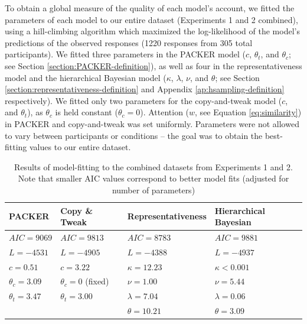 \documentclass[12pt]{article}
\begin{document}
\begin{flushleft}
To obtain a global measure of the quality of each model's account, we fitted the
parameters of each model to our entire dataset (Experiments 1 and 2 combined),
using a hill-climbing algorithm which maximized the log-likelihood of the
model's predictions of the observed responses (1220 responses from 305 total
participants). We fitted three parameters in the PACKER model ($c$, $\theta_t$,
and $\theta_c$; see Section \ref{section:PACKER-definition}), as well as four in
the representativeness model and the hierarchical Bayesian model ($\kappa$,
$\lambda$, $\nu$, and $\theta$; see Section
\ref{section:representativeness-definition} and Appendix
\ref{ap:hsampling-definition} respectively). We fitted only two parameters for
the copy-and-tweak model ($c$, and $\theta_t$), as $\theta_c$ is held constant
($\theta_c = 0$). Attention ($w$, see Equation \ref{eq:similarity}) in PACKER
and copy-and-tweak was set uniformly. Parameters were not allowed to vary
between participants or conditions -- the goal was to obtain the best-fitting
values to our entire dataset.

\begin{table} \centering
\caption{Results of model-fitting to the combined datasets from Experiments 1
and 2. Note that smaller AIC values correspond to better model fits (adjusted
for number of parameters)}
\label{table:global-model-fits}
\begin{tabular}{ l l l l} \\ \textbf{PACKER} & \textbf{Copy \& Tweak} &
\textbf{Representativeness} & \textbf{Hierarchical Bayesian} \\ \hline $AIC =
  9069$ & $AIC = 9813$ & $AIC = 8783$ &  $AIC =
9881$ \\ $L = -4531$ & $L = -4905$ & $L = -4388$ & $L = -4937$ \\ $c = 0.51$ &
                                                                                $c = 3.22$ & $\kappa = 12.23$ &
$\kappa < 0.001$ \\ $\theta_c = 3.09$ & $\theta_c = 0$ (fixed) & $\nu = 1.00$ & $\nu = 5.44$ \\
$\theta_t = 3.47$ & $\theta_t = 3.00$ & $\lambda = 7.04$& $\lambda
                                                                       = 0.06$
  \\ & &$\theta = 10.21 $& $\theta = 3.09$
\\
\end{tabular}
\end{table}



\end{flushleft}
\end{document}
